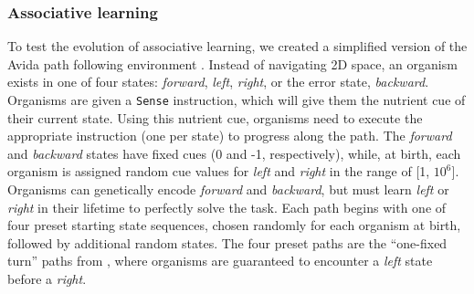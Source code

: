 
\subsubsection{Associative learning}
\label{subsub-environment}
To test the evolution of associative learning, we created a simplified version of the Avida path following environment \citep{pontesEvolutionaryOriginAssociative2020}. %
Instead of navigating 2D space, an organism exists in one of four states: \textit{forward}, \textit{left}, \textit{right}, or the error state, \textit{backward}.
%
Organisms are given a \texttt{Sense} instruction, which will give them the nutrient cue of their current state. 
Using this nutrient cue, organisms need to execute the appropriate instruction (one per state) to progress along the path.
The \textit{forward} and \textit{backward} states have fixed cues (0 and -1, respectively), while, at birth, each organism is assigned random cue values for \textit{left} and \textit{right} in the range of [1, $10^{6}$]. %
Organisms can genetically encode \textit{forward} and \textit{backward}, but must learn \textit{left} or \textit{right} in their lifetime to perfectly solve the task.
Each path begins with one of four preset starting state sequences, chosen randomly for each organism at birth, followed by additional random states. %
The four preset paths are the ``one-fixed turn'' paths from \citep{pontesEvolutionaryOriginAssociative2020}, where organisms are guaranteed to encounter a \textit{left} state before a \textit{right}.

